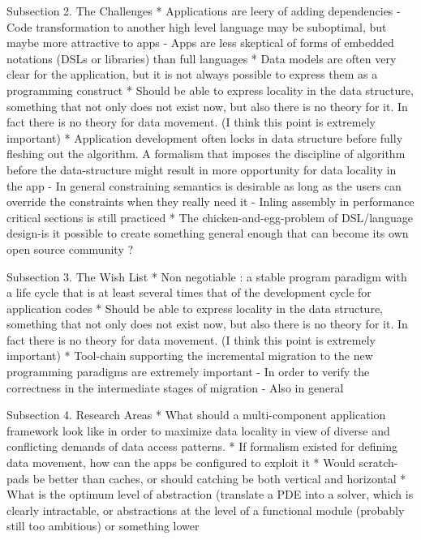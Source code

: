 Subsection 2. The Challenges
* Applications are leery of adding dependencies
   - Code transformation to another high level language may be
      suboptimal, but maybe more attractive to apps
   - Apps are less skeptical of forms of embedded notations (DSLs or
      libraries) than full languages
* Data models are often very clear for the application, but it is not
  always possible to express them as a programming construct
* Should be able to express locality in the data structure, something
  that not only does not exist now, but also there is no theory for
  it. In fact there is no theory for data movement. (I think this
  point is extremely important)
* Application development often locks in data structure before fully
   fleshing out the algorithm. A formalism that imposes the discipline
   of algorithm before the data-structure might result in more
   opportunity for data locality in the app
   - In general constraining semantics is desirable as long as the
      users can override the constraints when they really need it
   - Inling assembly in performance critical sections is still
      practiced
* The chicken-and-egg-problem of DSL/language design-is it possible to
   create something general enough that can become its own open source
   community ?

Subsection 3. The Wish List
* Non negotiable : a stable program paradigm with a life cycle that is
   at least several times that of the development cycle for
   application codes
* Should be able to express locality in the data structure, something
  that not only does not exist now, but also there is no theory for
  it. In fact there is no theory for data movement. (I think this
  point is extremely important)
* Tool-chain supporting the incremental migration to the new
  programming paradigms are extremely important 
  - In order to verify the correctness in the intermediate stages of
     migration  
  - Also in general 


Subsection 4. Research Areas
* What should a multi-component application framework look like in
   order to maximize data locality in view of diverse and conflicting
   demands of data access patterns. 
* If formalism existed for defining data movement, how can the apps
   be configured to exploit it
* Would scratch-pads be better than caches, or should catching be
   both vertical and horizontal
* What is the optimum level of abstraction (translate a PDE into a
   solver, which is clearly intractable, or abstractions at the level
   of a functional module (probably still too ambitious) or something
   lower 
